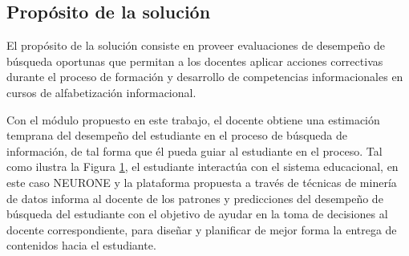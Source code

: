 \subsection{Propósito de la solución}
\label{subsec:proposito-solucion}
El propósito de la solución consiste en proveer evaluaciones de desempeño de búsqueda oportunas que permitan a los docentes aplicar acciones correctivas durante el proceso de formación y desarrollo de competencias informacionales en cursos de alfabetización informacional.

Con el módulo propuesto en este trabajo, el docente obtiene una estimación temprana del desempeño del estudiante en el proceso de búsqueda de información, de tal forma que él pueda guiar al estudiante en el proceso. Tal como ilustra la Figura \ref{fig:docente_estudiante}, el estudiante interactúa con el sistema educacional, en este caso NEURONE y la plataforma propuesta a través de técnicas de minería de datos informa al docente de los patrones y predicciones del desempeño de búsqueda del estudiante con el objetivo de ayudar en la toma de decisiones al docente correspondiente, para diseñar y planificar de mejor forma la entrega de contenidos hacia el estudiante.

\begin{figure}[H]
	\centering
	
	\label{fig:docente_estudiante}
\end{figure}


%
%
%


